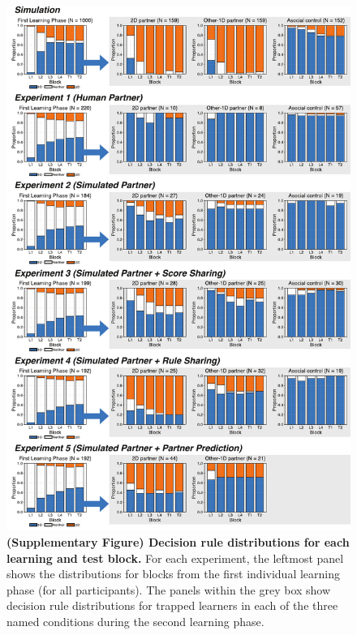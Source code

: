 \documentclass[11pt]{article} %
\begin{document}
\begin{figure}
    \centering
    \includegraphics[width=0.8 \linewidth]{learning-phases-6.pdf}
    \caption{\textbf{(Supplementary Figure) Decision rule distributions for each learning and test block.} For each experiment, the leftmost panel shows the distributions for blocks from the first individual learning phase (for all participants). The panels within the grey box show decision rule distributions for trapped learners in each of the three named conditions during the second learning phase.}
    \label{fig:drule-distributions}
\end{figure}



\setlength{\bibleftmargin}{.125in}
\setlength{\bibindent}{-\bibleftmargin}


\end{document}
